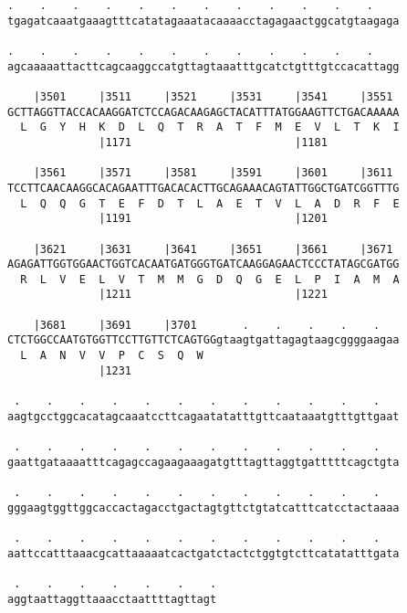 \documentclass{article}
\begin{document}
\begin{Verbatim}
.    .    .    .    .    .    .    .    .    .    .    .    
tgagatcaaatgaaagtttcatatagaaatacaaaacctagagaactggcatgtaagaga
                                                            
.    .    .    .    .    .    .    .    .    .    .    .    
agcaaaaattacttcagcaaggccatgttagtaaatttgcatctgtttgtccacattagg
                                                            
    |3501     |3511     |3521     |3531     |3541     |3551 
GCTTAGGTTACCACAAGGATCTCCAGACAAGAGCTACATTTATGGAAGTTCTGACAAAAA
  L  G  Y  H  K  D  L  Q  T  R  A  T  F  M  E  V  L  T  K  I
              |1171                         |1181           
  
    |3561     |3571     |3581     |3591     |3601     |3611 
TCCTTCAACAAGGCACAGAATTTGACACACTTGCAGAAACAGTATTGGCTGATCGGTTTG
  L  Q  Q  G  T  E  F  D  T  L  A  E  T  V  L  A  D  R  F  E
              |1191                         |1201           
  
    |3621     |3631     |3641     |3651     |3661     |3671 
AGAGATTGGTGGAACTGGTCACAATGATGGGTGATCAAGGAGAACTCCCTATAGCGATGG
  R  L  V  E  L  V  T  M  M  G  D  Q  G  E  L  P  I  A  M  A
              |1211                         |1221           
  
    |3681     |3691     |3701       .    .    .    .    .   
CTCTGGCCAATGTGGTTCCTTGTTCTCAGTGGgtaagtgattagagtaagcggggaagaa
  L  A  N  V  V  P  C  S  Q  W                              
              |1231                                         
  
 .    .    .    .    .    .    .    .    .    .    .    .   
aagtgcctggcacatagcaaatccttcagaatatatttgttcaataaatgtttgttgaat
                                                            
 .    .    .    .    .    .    .    .    .    .    .    .   
gaattgataaaatttcagagccagaagaaagatgtttagttaggtgatttttcagctgta
                                                            
 .    .    .    .    .    .    .    .    .    .    .    .   
gggaagtggttggcaccactagacctgactagtgttctgtatcatttcatcctactaaaa
                                                            
 .    .    .    .    .    .    .    .    .    .    .    .   
aattccatttaaacgcattaaaaatcactgatctactctggtgtcttcatatatttgata
                                                            
 .    .    .    .    .    .    .
aggtaattaggttaaacctaattttagttagt
                                

\end{Verbatim}
\end{document}
